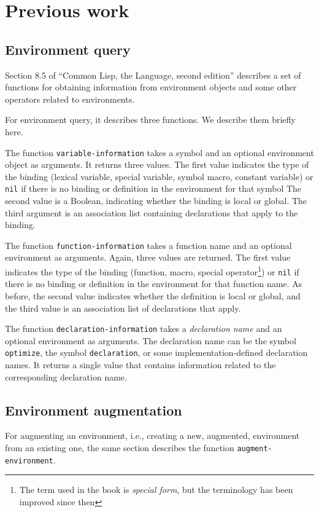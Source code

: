 \section{Previous work}

\subsection{Environment query}

Section 8.5 of ``Common Lisp, the Language, second edition'' describes
a set of functions for obtaining information from environment
objects and some other operators related to environments.

For environment query, it describes three functions.  We describe them
briefly here.

The function \texttt{variable-information} takes a symbol and an
optional environment object as arguments.  It returns three values.
The first value indicates the type of the binding (lexical variable,
special variable, symbol macro, constant variable) or \texttt{nil} if
there is no binding or definition in the environment for that symbol
The second value is a Boolean, indicating whether the binding is local
or global.  The third argument is an association list containing
declarations that apply to the binding.

The function \texttt{function-information} takes a function name and
an optional environment as arguments.  Again, three values are
returned.  The first value indicates the type of the binding
(function, macro, special operator\footnote{The term used in the book
  is \emph{special form}, but the terminology has been improved since
  then}) or \texttt{nil} if there is no binding or definition in the
environment for that function name.  As before, the second value
indicates whether the definition is local or global, and the third
value is an association list of declarations that apply.

The function \texttt{declaration-information} takes a
\emph{declaration name} and an optional environment as arguments.  The
declaration name can be the symbol \texttt{optimize}, the symbol
\texttt{declaration}, or some implementation-defined declaration
names.  It returns a single value that contains information related to
the corresponding declaration name.

\subsection{Environment augmentation}

For augmenting an environment, i.e., creating a new, augmented,
environment from an existing one, the same section describes the
function \texttt{augment-environment}.
